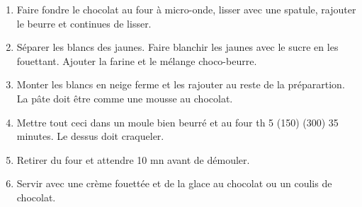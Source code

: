 
\begin{ingredients}
\end{ingredients}


\begin{recipe}
  \begin{enumerate}

  \item Faire fondre le chocolat au four à micro-onde, lisser avec une
    spatule, rajouter le beurre et continues de lisser.

  \item S\'eparer les blancs des jaunes. Faire blanchir les jaunes avec le sucre
    en les fouettant.  Ajouter la farine et le m\'elange choco-beurre.

  \item Monter les blancs en neige ferme et les rajouter au reste de
    la pr\'eparartion.  La p\^ate doit \^etre comme une mousse au chocolat.

  \item Mettre tout ceci dans un moule bien beurr\'e et
    au four th 5 (150\C) (300\F) 35 minutes.  Le dessus doit craqueler.

  \item Retirer du four et attendre 10 mn avant de d\'emouler.

  \item Servir avec une cr\`eme fouett\'ee et de la glace au
    chocolat ou un coulis de chocolat.

  \end{enumerate}
\end{recipe}

